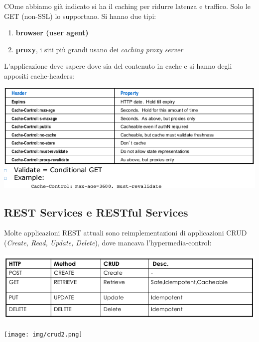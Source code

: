 \documentclass[a4paper,12pt, oneside]{book}
\begin{document}
COme abbiamo già indicato si ha il caching per ridurre latenza e traffico. Solo le GET (non-SSL) lo supportano. Si hanno due tipi:
\begin{enumerate}
\item \textbf{browser (user agent)}
\item \textbf{proxy}, i siti più grandi usano dei \textit{caching proxy server}
\end{enumerate}
\newpage
L'applicazione deve sapere dove sia del contenuto in cache e si hanno degli appositi cache-headers:
\begin{center}
  \includegraphics[scale=0.7]{img/cachehead.png}
\end{center}
\subsection{REST Services e RESTful Services}
Molte applicazioni REST attuali sono reimplementazioni di applicazioni CRUD (\textit{Create, Read, Update, Delete}), dove mancava l'hypermedia-control:
\begin{center}
\includegraphics[scale=0.6]{img/crud.png}
\end{center}
\begin{center}
\texttt{[image: img/crud2.png]}
\end{center}
\end{document}
